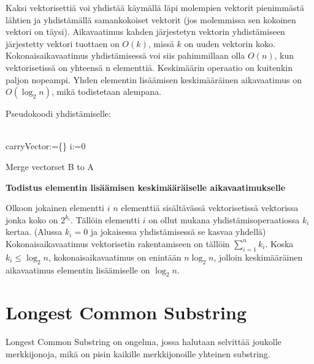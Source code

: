 \documentclass{article}
\begin{document}
    Kaksi vektorisettiä voi yhdistää käymällä läpi molempien vektorit pienimmästä lähtien ja yhdistämällä samankokoiset vektorit 
    (jos molemmissa sen kokoinen vektori on täysi). Aikavaatimus kahden järjestetyn vektorin yhdistämiseen järjestetty vektori
    tuottaen on $O(k)$, missä $k$ on uuden vektorin koko. Kokonaisaikavaatimus yhdistämisessä voi siis pahimmillaan olla $O(n)$,
    kun vektorisetissä on yhteensä n elementtiä. Keskimäärin operaatio on kuitenkin paljon nopeampi. Yhden elementin lisäämisen
    keskimääräinen aikavaatimus on $O(\log_2 n)$, mikä todistetaan alempana.
    
    Pseudokoodi yhdistämiselle:
    \\ \\
    \begin{algorithm}[H]
        carryVector:=\{\}\;
        i:=0\;
        \caption{Merge vectorset B to A}
    \end{algorithm}
    
    \medskip \medskip
    \textbf{Todistus elementin lisäämisen keskimääräiselle aikavaatimukselle}

    Olkoon jokainen elementti $i$ $n$ elementtiä sisältävässä vektorisetissä vektorissa jonka koko on $2^{k_i}$. Tällöin
    elementti $i$ on ollut mukana yhdistämisoperaatiossa $k_i$ kertaa. (Alussa $k_i=0$ ja jokaisessa yhdistämisessä 
    se kasvaa yhdellä) Kokonaisaikavaatimus vektorisetin rakentamiseen on tällöin $\sum_{i=1}^n{k_i}$. Koska $k_i\leq \log_2n$,
    kokonaisaikavaatimus on enintään $n\log_2n$, jolloin keskimääräinen aikavaatimus elementin lisäämiselle on $\log_2 n$.

  \newpage
  \section{Longest Common Substring}
    Longest Common Substring on ongelma, jossa halutaan selvittää joukolle merkkijonoja, mikä on pisin kaikille merkkijonoille
    yhteinen substring.
    
\end{document}
